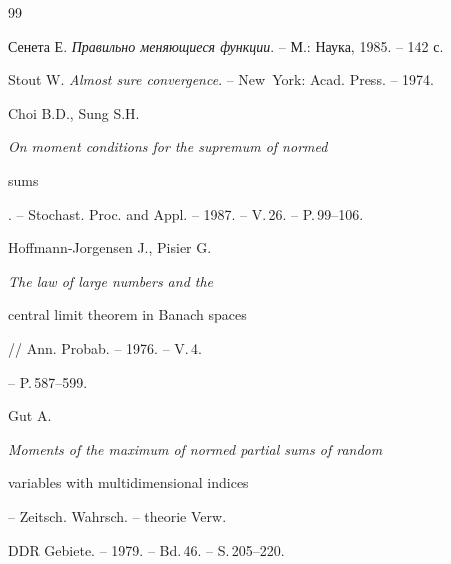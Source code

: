 \begin{thebibliography}{99}
 




Сенета Е. {\em Правильно меняющиеся функции}. -- М.: Наука, 1985. -- 142 с. 


 




Stout W. {\em Almost sure convergence}. -- New~York: Acad. Press. -- 1974. 


 




Choi B.D., Sung S.H. {\em On moment conditions for the supremum of normed 


sums}. -- Stochast. Proc. and Appl. -- 1987. -- V.\,26. -- P.\,99--106. 


 




Hoffmann-Jorgensen J., Pisier G. {\em The law of large numbers and the 


central limit theorem in Banach spaces} // Ann. Probab. -- 1976. -- V.\,4. 


-- P.\,587--599. 


 




Gut A. {\em Moments of the maximum of normed partial sums of random 


variables with multidimensional indices} -- Zeitsch. Wahrsch. -- theorie Verw. 


DDR Gebiete. -- 1979. -- Bd.\,46. -- S.\,205--220. 


 


 


\end{thebibliography} 


 


\vskip 2cm 


 






 


 


